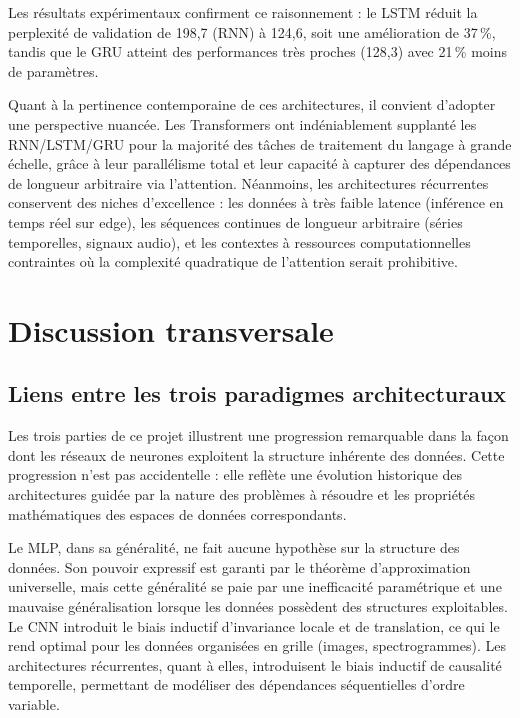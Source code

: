 \documentclass[11pt,a4paper]{article}
\begin{document}
Les résultats expérimentaux confirment ce raisonnement : le LSTM réduit la perplexité
de validation de 198,7 (RNN) à 124,6, soit une amélioration de 37\,\%, tandis que le
GRU atteint des performances très proches (128,3) avec 21\,\% moins de paramètres.

Quant à la pertinence contemporaine de ces architectures, il convient d'adopter une
perspective nuancée. Les Transformers ont indéniablement supplanté les RNN/LSTM/GRU
pour la majorité des tâches de traitement du langage à grande échelle, grâce à leur
parallélisme total et leur capacité à capturer des dépendances de longueur arbitraire
via l'attention. Néanmoins, les architectures récurrentes conservent des niches
d'excellence : les données à très faible latence (inférence en temps réel sur edge),
les séquences continues de longueur arbitraire (séries temporelles, signaux audio),
et les contextes à ressources computationnelles contraintes où la complexité quadratique
de l'attention serait prohibitive.

\section{Discussion transversale}

\subsection{Liens entre les trois paradigmes architecturaux}

Les trois parties de ce projet illustrent une progression remarquable dans la façon
dont les réseaux de neurones exploitent la structure inhérente des données. Cette
progression n'est pas accidentelle : elle reflète une évolution historique des
architectures guidée par la nature des problèmes à résoudre et les propriétés
mathématiques des espaces de données correspondants.

Le MLP, dans sa généralité, ne fait aucune hypothèse sur la structure des données.
Son pouvoir expressif est garanti par le théorème d'approximation universelle, mais
cette généralité se paie par une inefficacité paramétrique et une mauvaise
généralisation lorsque les données possèdent des structures exploitables. Le CNN
introduit le biais inductif d'invariance locale et de translation, ce qui le rend
optimal pour les données organisées en grille (images, spectrogrammes). Les architectures
récurrentes, quant à elles, introduisent le biais inductif de causalité temporelle,
permettant de modéliser des dépendances séquentielles d'ordre variable.
\end{document}
